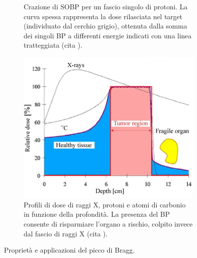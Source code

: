 \documentclass[12pt,a4paper,twoside]{report}
\begin{document}
\begin{figure}[H]
\begin{subfigure}[t]{0.49\textwidth}
			\caption{Crazione di SOBP per un fascio singolo di protoni. La curva spessa rappresenta la dose rilasciata nel target (individuato dal cerchio grigio), ottenuta dalla somma dei singoli BP a differenti energie indicati con una linea tratteggiata (cita
				).}
			\label{fig:sobp}
		\end{subfigure}
		\par
		\begin{subfigure}[t]{0.49\textwidth}
			\centering
			\includegraphics[width=\textwidth, scale=0.50]{critical_organ.jpg}
			\caption{Profili di dose di raggi X, protoni e atomi di carbonio in funzione della profondità. La presenza del BP consente di risparmiare l'organo a rischio, colpito invece dal fascio di raggi X (cita
				).}
			\label{fig:critical_organ}
		\end{subfigure}
		\caption{Proprietà e applicazioni del picco di Bragg.}
	\end{figure}
	
\end{document}
